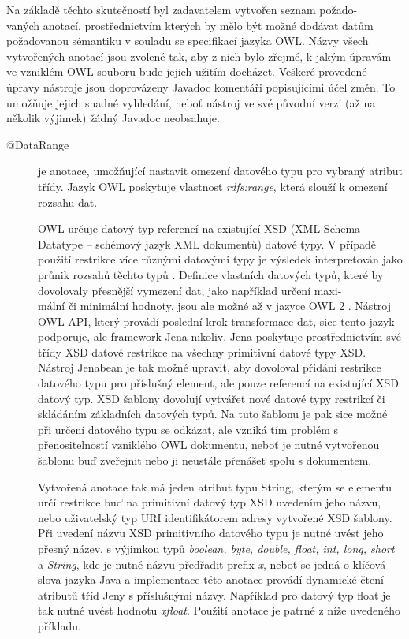 \documentclass{projekt}
\begin{document}
Na základě těchto skutečností byl zadavatelem vytvořen seznam požado-\\vaných anotací, prostřednictvím kterých by mělo být možné dodávat datům požadovanou sémantiku v souladu se specifikací jazyka OWL. Názvy všech vytvořených anotací jsou zvolené tak, aby z nich bylo zřejmé, k jakým úpravám ve vzniklém OWL souboru bude jejich užitím docházet. 
Veškeré provedené úpravy nástroje jsou doprovázeny Javadoc komentáři popisujícími účel změn. To umožňuje jejich snadné vyhledání, neboť nástroj ve své původní verzi (až na několik výjimek) žádný Javadoc neobsahuje.\\


\begin{description}
\item[@DataRange] je anotace, umožňující nastavit omezení datového typu pro vybraný atribut třídy. Jazyk OWL poskytuje vlastnost {\it rdfs:range}, která slouží k omezení rozsahu dat.


OWL určuje datový typ referencí na existující XSD (XML Schema Datatype – schémový jazyk XML dokumentů) datové typy.  V případě použití restrikce více různými datovými typy je výsledek interpretován jako průnik rozsahů těchto typů \cite{patnact}. Definice vlastních datových typů, které by dovolovaly přesnější vymezení dat, jako například určení maxi-\\mální či minimální hodnoty, jsou ale možné až v jazyce OWL 2 \cite{sedmnact}. Nástroj OWL API, který provádí poslední krok transformace dat, sice tento jazyk podporuje, ale framework Jena nikoliv. Jena poskytuje prostřednictvím své třídy XSD datové restrikce na všechny primitivní datové typy XSD. Nástroj Jenabean je tak možné upravit, aby dovoloval přidání restrikce datového typu pro příslušný element, ale pouze referencí na existující XSD datový typ. XSD šablony dovolují vytvářet nové datové typy restrikcí či skládáním základních datových typů. Na tuto šablonu je pak sice možné při určení datového typu se odkázat, ale vzniká tím problém s přenositelností vzniklého OWL dokumentu, neboť je nutné vytvořenou šablonu buď zveřejnit nebo ji neustále přenášet spolu s dokumentem.

Vytvořená anotace tak má jeden atribut typu String, kterým se elementu určí restrikce buď na  primitivní datový typ XSD uvedením jeho názvu, nebo uživatelský typ URI identifikátorem adresy vytvořené XSD šablony. Při uvedení názvu XSD primitivního datového typu je nutné uvést jeho přesný název, s výjimkou typů {\it boolean, byte, double, float, int, long, short} a {\it String}, kde je nutné názvu předřadit prefix {\it x}, neboť se jedná o klíčová slova jazyka Java a implementace této anotace provádí dynamické čtení atributů tříd Jeny s příslušnými názvy. Například pro datový typ float je tak nutné uvést hodnotu {\it xfloat}.
Použití anotace je patrné z níže uvedeného příkladu.



\end{description}
\end{document}
